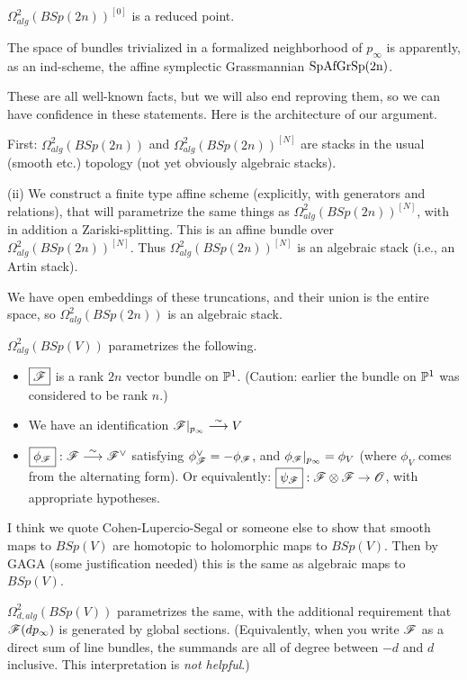 {$\Omega^2_{alg}(BSp(2n))^{[0]}$ is a reduced point.

The space of  bundles trivialized in a formalized neighborhood of $p_\infty$ is apparently, as an ind-scheme, the affine symplectic Grassmannian $\rm{SpAfGr}{Sp(2n)}$.

These are all well-known facts, but we will also end reproving them, so we can have confidence in these statements.  Here is the architecture of our argument.

First:
$\Omega^2_{alg}(BSp(2n))$ and $\Omega^2_{alg}(BSp(2n))^{[N]}$
are stacks in the usual (smooth etc.) topology (not yet obviously algebraic stacks).  

(ii) 
We construct a finite type affine scheme (explicitly, with generators and relations), that will parametrize the same things as  $\Omega^2_{alg}(BSp(2n))^{[N]}$, with in addition a Zariski-splitting.  This is an affine bundle  over $\Omega^2_{alg}(BSp(2n))^{[N]}$.  Thus $\Omega^2_{alg}(BSp(2n))^{[N]}$ is an algebraic stack (i.e., an Artin stack).

We  have open embeddings of these truncations, and their union is  the entire space, so $\Omega^2_{alg}(BSp(2n))$ is an algebraic stack.




$\Omega^2_{alg}(B Sp(V))$ parametrizes the following.

\begin{itemize}
\item $\boxed{{\mathscr{F}}}$ is a rank $2n$ vector bundle on $\mathbb P^1$.  (Caution:  earlier the bundle on $\mathbb P^1$ was considered to be rank $n$.)
\item  We have an identification ${\mathscr{F}}|_{p_{\infty}} \overset \sim \longrightarrow V$
\item $\boxed{\phi_{\mathscr{F}}}: {\mathscr{F}} \overset \sim \longrightarrow {\mathscr{F}}^\vee$ satisfying 
$\phi^\vee_{\mathscr{F}} = -\phi_{\mathscr{F}}$, and $\phi_{{\mathscr{F}}}|_{p_\infty} = \phi_V$ (where $\phi_V$ comes
from the alternating form).    Or equivalently:  $\boxed{\psi_{{\mathscr{F}}}}: {\mathscr{F}}\otimes {\mathscr{F}} \rightarrow {\mathscr{O}}$,
with appropriate hypotheses.
\end{itemize}


I think we quote Cohen-Lupercio-Segal or someone else to show that smooth maps to $BSp(V)$ are homotopic to holomorphic maps to $BSp(V)$.
Then by GAGA (some justification needed) this is the same as algebraic maps to $BSp(V)$.

\point $\boxed{\Omega^2_{d,alg}(B Sp(V))}$ parametrizes the same, with the additional requirement that ${\mathscr{F}}(d p_\infty)$ is
generated by global sections.  (Equivalently, when you write ${\mathscr{F}}$ as a direct sum of line bundles, the summands
are all of degree between $-d$ and $d$ inclusive.  This interpretation is {\em not helpful}.)

}
